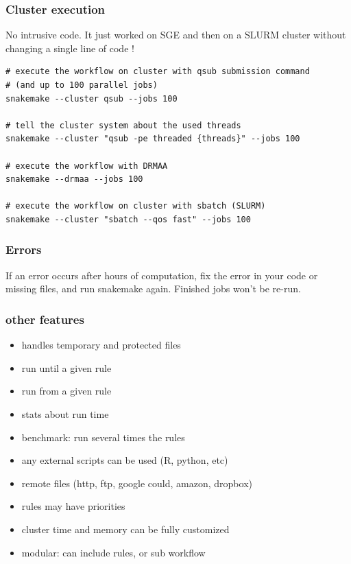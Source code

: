 \documentclass{beamer}
\begin{document}
\begin{frame}[fragile]
\frametitle{Cluster execution}

No intrusive code. It just worked on SGE and then on a SLURM cluster 
without changing a single line of code !

\begin{lstlisting}
# execute the workflow on cluster with qsub submission command
# (and up to 100 parallel jobs)
snakemake --cluster qsub --jobs 100

# tell the cluster system about the used threads
snakemake --cluster "qsub -pe threaded {threads}" --jobs 100

# execute the workflow with DRMAA
snakemake --drmaa --jobs 100

# execute the workflow on cluster with sbatch (SLURM)
snakemake --cluster "sbatch --qos fast" --jobs 100

\end{lstlisting}
\end{frame}


\begin{frame}
 \frametitle{Errors}
 
 If an error occurs after hours of computation, fix the error in your code or missing files, 
 and run snakemake again. Finished jobs won't be re-run. 
 
\end{frame}


\begin{frame}
\frametitle{other features}

\begin{itemize}
\item handles temporary and protected files
\item run until a given rule
\item run from a given rule
\item stats about run time
\item benchmark: run several times the rules
\item any external scripts can be used (R, python, etc)
\item remote files (http, ftp, google could, amazon, dropbox)
\item rules may have priorities
\item cluster time and memory can be fully customized
\item modular: can include rules, or sub workflow
\end{itemize}

\end{frame}
\end{document}
